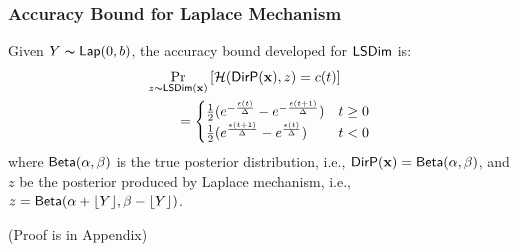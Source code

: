 \documentclass{article}
\begin{document}
\subsubsection{Accuracy Bound for Laplace Mechanism}
\label{subsec_accuracy_lap}
\begin{lem}
\label{lem_acc_lap}
Given $Y \thicksim \mathsf{Lap}(0, b)$, the accuracy bound developed for $\mathsf{LSDim}$ is:
\begin{align*}
&
\underset{z \thicksim \mathsf{LSDim}(\textbf{x})}{\Pr}\left[ 
\mathcal{H}(\mathsf{DirP}(\textbf{x}), z ) = c(t)
 \right]
\\
&\qquad = 
\begin{cases}
\frac{1}{2} (e^{- \frac{\epsilon (t)}{\Delta }} - e^{- \frac{\epsilon (t + 1)}{\Delta }}) &  t \geq 0\\
\frac{1}{2} (e^{\frac{\epsilon (t + 1)}{\Delta }} - e^{\frac{\epsilon (t)}{\Delta }}) & t < 0
\end{cases}
\end{align*}
where $\mathsf{Beta}(\alpha, \beta)$ is the true posterior distribution, i.e., $\mathsf{DirP}(\textbf{x}) = \mathsf{Beta}(\alpha, \beta)$, and $z$ be the posterior produced by Laplace mechanism, i.e., $z = \mathsf{Beta}(\alpha + \lfloor Y \rfloor, \beta - \lfloor Y \rfloor)$.
\end{lem}
(Proof is in Appendix)
\end{document}
